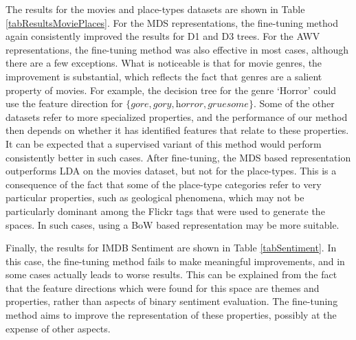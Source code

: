 The results for the movies and place-types datasets are shown in Table \ref{tabResultsMoviePlaces}. For the MDS representations, the fine-tuning method again consistently improved the results for D1 and D3 trees. For the AWV representations, the fine-tuning method was also effective in most cases, although there are a few exceptions. What is noticeable is that for movie genres, the improvement is substantial, which reflects the fact that genres are a salient property of movies. For example, the decision tree for the genre `Horror' could use the feature direction for $\{\textit{gore}, \textit{gory}, \textit{horror}, \textit{gruesome}\}$. Some of the other datasets refer to more specialized properties, and the performance of our method then depends on whether it has identified features that relate to these properties. It can be expected that a supervised variant of this method would perform consistently better in such cases. After fine-tuning, the MDS based representation outperforms LDA on the movies dataset, but not for the place-types. This is a consequence of the fact that some of the place-type categories refer to very particular properties, such as geological phenomena, which may not be particularly dominant among the Flickr tags that were used to generate the spaces. In such cases, using a BoW based representation may be more suitable.

Finally, the results for IMDB Sentiment are shown in Table \ref{tabSentiment}. In this case, the fine-tuning method fails to make meaningful improvements, and in some cases actually leads to worse results. This can be explained from the fact that the feature directions which were found for this space are themes and properties, rather than aspects of binary sentiment evaluation. The fine-tuning method aims to improve the representation of these properties, possibly at the expense of other aspects.

